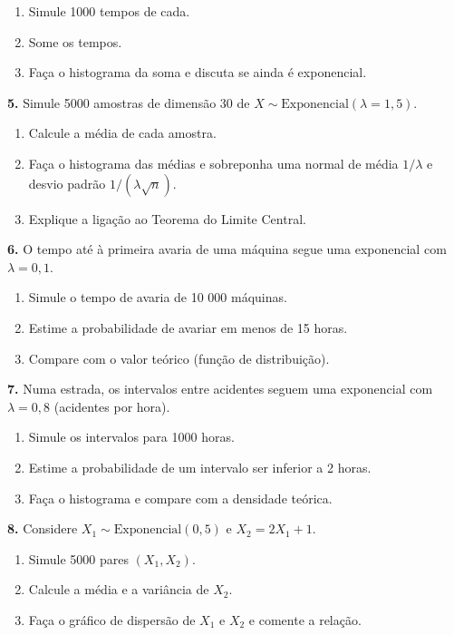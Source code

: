 \documentclass[
  portuguese,
  11pt,
  openany]{book}
\providecommand{\tightlist}{%
  \setlength{\itemsep}{0pt}\setlength{\parskip}{0pt}}
\begin{document}
\begin{enumerate}
\def\labelenumi{(\alph{enumi})}
\tightlist
\item
  Simule 1000 tempos de cada.
\item
  Some os tempos.
\item
  Faça o histograma da soma e discuta se ainda é exponencial.
\end{enumerate}

\textbf{5.} Simule 5000 amostras de dimensão 30 de \(X \sim \text{Exponencial}(\lambda = 1{,}5)\).

\begin{enumerate}
\def\labelenumi{(\alph{enumi})}
\tightlist
\item
  Calcule a média de cada amostra.
\item
  Faça o histograma das médias e sobreponha uma normal de média \(1/\lambda\) e desvio
  padrão \(1/(\lambda\sqrt{n})\).
\item
  Explique a ligação ao Teorema do Limite Central.
\end{enumerate}

\textbf{6.} O tempo até à primeira avaria de uma máquina segue uma exponencial com
\(\lambda = 0{,}1\).

\begin{enumerate}
\def\labelenumi{(\alph{enumi})}
\tightlist
\item
  Simule o tempo de avaria de 10 000 máquinas.
\item
  Estime a probabilidade de avariar em menos de 15 horas.
\item
  Compare com o valor teórico (função de distribuição).
\end{enumerate}

\textbf{7.} Numa estrada, os intervalos entre acidentes seguem uma exponencial com
\(\lambda = 0{,}8\) (acidentes por hora).

\begin{enumerate}
\def\labelenumi{(\alph{enumi})}
\tightlist
\item
  Simule os intervalos para 1000 horas.
\item
  Estime a probabilidade de um intervalo ser inferior a 2 horas.
\item
  Faça o histograma e compare com a densidade teórica.
\end{enumerate}

\textbf{8.} Considere \(X_1 \sim \text{Exponencial}(0{,}5)\) e \(X_2 = 2X_1 + 1\).

\begin{enumerate}
\def\labelenumi{(\alph{enumi})}
\tightlist
\item
  Simule 5000 pares \((X_1, X_2)\).
\item
  Calcule a média e a variância de \(X_2\).
\item
  Faça o gráfico de dispersão de \(X_1\) e \(X_2\) e comente a relação.
\end{enumerate}
\end{document}
